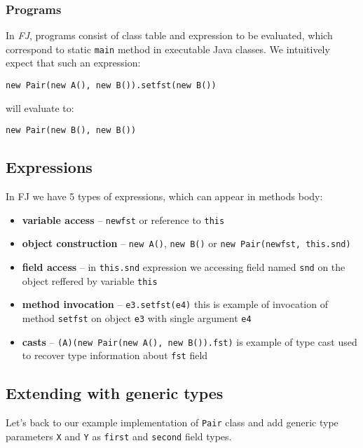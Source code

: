 \documentclass{article}[12pt]
\begin{document}
\subsubsection{Programs}

In \emph{FJ}, programs consist of class table and expression to be evaluated, which correspond to static \texttt{main} method in executable Java classes. We intuitively expect that such an expression:

\begin{verbatim}
new Pair(new A(), new B()).setfst(new B())
\end{verbatim}
will evaluate to:
\begin{verbatim}
new Pair(new B(), new B())
\end{verbatim}


\subsection{Expressions}

In FJ we have 5 types of expressions, which can appear in methods body:

\begin{itemize}
\item{\textbf{variable access}} -- \texttt{newfst} or reference to \texttt{this}
\item{\textbf{object construction}} -- \texttt{new A()}, \texttt{new B()} or \texttt{new Pair(newfst, this.snd)}
\item{\textbf{field access}} -- in \texttt{this.snd} expression we accessing field named \texttt{snd} on the object reffered by variable \texttt{this}
\item{\textbf{method invocation}} -- \texttt{e3.setfst(e4)} this is example of invocation of method \texttt{setfst} on object \texttt{e3} with single argument \texttt{e4}
\item{\textbf{casts}} -- \texttt{(A)(new Pair(new A(), new B()).fst)} is example of type cast used to recover type information about \texttt{fst} field
\end{itemize}


\subsection{Extending with generic types}

Let's back to our example implementation of \texttt{Pair} class and add generic type parameters \texttt{X} and \texttt{Y} as \texttt{first} and \texttt{second} field types.
\end{document}
